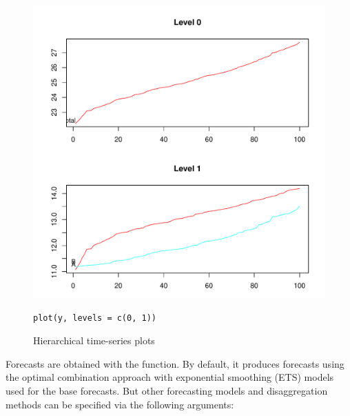 \documentclass[nojss]{jss}
\begin{document}
\begin{figure}[!htbp]
\caption{Hierarchical time-series plots}\label{fig:1}
\centering
\includegraphics[width=\textwidth]{hts_plot}
\begin{Verbatim}
plot(y, levels = c(0, 1))
\end{Verbatim}
\end{figure}     

Forecasts are obtained with the  function. By default, it produces forecasts using the optimal combination approach with exponential smoothing (ETS) models used for the base forecasts. But other forecasting models and disaggregation methods can be specified via the following arguments:
      
\end{document}
